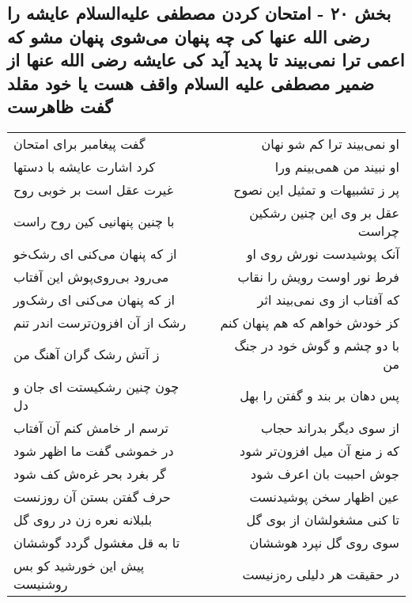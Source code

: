 \begin{center}
\section*{بخش ۲۰ - امتحان کردن مصطفی علیه‌السلام عایشه را رضی الله عنها کی چه پنهان می‌شوی پنهان مشو که اعمی ترا نمی‌بیند تا پدید آید کی عایشه رضی الله عنها از ضمیر مصطفی علیه السلام واقف هست  یا خود مقلد گفت ظاهرست}
\label{sec:sh020}
\begin{longtable}{l p{0.5cm} r}
گفت پیغامبر برای امتحان
&&
او نمی‌بیند ترا کم شو نهان
\\
کرد اشارت عایشه با دستها
&&
او نبیند من همی‌بینم ورا
\\
غیرت عقل است بر خوبی روح
&&
پر ز تشبیهات و تمثیل این نصوح
\\
با چنین پنهانیی کین روح راست
&&
عقل بر وی این چنین رشکین چراست
\\
از که پنهان می‌کنی ای رشک‌خو
&&
آنک پوشیدست نورش روی او
\\
می‌رود بی‌روی‌پوش این آفتاب
&&
فرط نور اوست رویش را نقاب
\\
از که پنهان می‌کنی ای رشک‌ور
&&
که آفتاب از وی نمی‌بیند اثر
\\
رشک از آن افزون‌ترست اندر تنم
&&
کز خودش خواهم که هم پنهان کنم
\\
ز آتش رشک گران آهنگ من
&&
با دو چشم و گوش خود در جنگ من
\\
چون چنین رشکیستت ای جان و دل
&&
پس دهان بر بند و گفتن را بهل
\\
ترسم ار خامش کنم آن آفتاب
&&
از سوی دیگر بدراند حجاب
\\
در خموشی گفت ما اظهر شود
&&
که ز منع آن میل افزون‌تر شود
\\
گر بغرد بحر غره‌ش کف شود
&&
جوش احببت بان اعرف شود
\\
حرف گفتن بستن آن روزنست
&&
عین اظهار سخن پوشیدنست
\\
بلبلانه نعره زن در روی گل
&&
تا کنی مشغولشان از بوی گل
\\
تا به قل مغشول گردد گوششان
&&
سوی روی گل نپرد هوششان
\\
پیش این خورشید کو بس روشنیست
&&
در حقیقت هر دلیلی ره‌زنیست
\\
\end{longtable}
\end{center}
